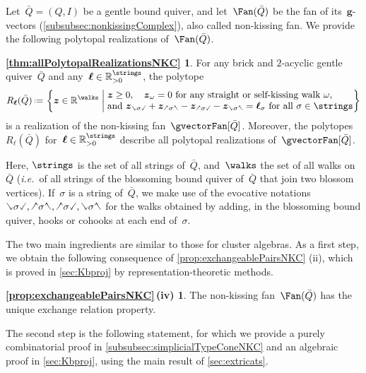 \documentclass{amsart}
\theoremstyle{definition}
\newcommand{\R}{\mathbb{R}} %
\renewcommand{\b}[1]{{\boldsymbol{#1}}} %
\newcommand{\set}[2]{\left\{ #1 \;\middle|\; #2 \right\}} %
\newcommand{\eqdef}{\mbox{\,\raisebox{0.2ex}{\scriptsize\ensuremath{\mathrm:}}\ensuremath{=}\,}} %
\newcommand{\ie}{\textit{i.e.}~} %
\newcommand{\quiver}{\bar Q} %
\newcommand{\hL}{\text{\rotatebox[origin=c]{180}{\checked}}}
\newcommand{\hR}{\text{\rotatebox[origin=c]{180}{\reflectbox{\checked}}}}
\newcommand{\cL}{\text{\reflectbox{\checked}}}
\newcommand{\cR}{\text{\checked}}
\newcommand{\hh}[1]{\hL#1\hR} %
\newcommand{\cc}[1]{\cL#1\cR} %
\newcommand{\hc}[1]{\hL#1\cR} %
\newcommand{\ch}[1]{\cL#1\hR} %
\begin{document}
Let~$\quiver = (Q,I)$ be a gentle bound quiver, and let~$\Fan(\quiver)$ be the fan of its~$\b{g}$-vectors (\cref{subsubsec:nonkissingComplex}), also called non-kissing fan.
We provide the following polytopal realizations of~$\Fan(\quiver)$.

\newtheorem*{thm:allPolytopalRealizationsNKC}{\cref{thm:allPolytopalRealizationsNKC}}
\begin{thm:allPolytopalRealizationsNKC}
For any brick and $2$-acyclic gentle quiver~$\quiver$ and any~$\b{\ell} \in \R_{>0}^{\strings}$, the polytope
\[
R_\b{\ell}(\quiver) \eqdef \set{\b{z} \in \R^{\walks}}{\begin{array}{@{}l@{}} \b{z} \ge 0, \quad \b{z}_\omega = 0 \text{ for any straight or self-kissing walk } \omega, \\ \text{and } \b{z}_{\cc{\sigma}} + \b{z}_{\hh{\sigma}} - \b{z}_{\hc{\sigma}} - \b{z}_{\ch{\sigma}} = \b{\ell}_\sigma \text{ for all } \sigma \in \strings\end{array}}
\]
is a realization of the non-kissing fan~$\gvectorFan[\quiver]$.
Moreover, the polytopes~$R_\b{\ell}(\quiver)$ for~$\b{\ell} \in \R_{>0}^{\strings}$ describe all polytopal realizations of~$\gvectorFan[\quiver]$.
\end{thm:allPolytopalRealizationsNKC}

Here, $\strings$ is the set of all strings of~$\quiver$, and~$\walks$ the set of all walks on~$\quiver$ (\ie of all strings of the blossoming bound quiver of~$\quiver$ that join two blossom vertices).
If~$\sigma$ is a string of~$\quiver$, we make use of the evocative notations~$\cc{\sigma}, \hh{\sigma}, \hc{\sigma}, \ch{\sigma}$ for the walks obtained by adding, in the blossoming bound quiver, hooks or cohooks at each end of~$\sigma$.

\medskip

The two main ingredients are similar to those for cluster algebras.
As a first step, we obtain the following consequence of \cref{prop:exchangeablePairsNKC} (ii), which is proved in \cref{sec:Kbproj} by representation-theoretic methods.

\newtheorem*{prop:exchangeablePairsNKC}{\cref{prop:exchangeablePairsNKC}\,{\normalfont (iv)}}
\begin{prop:exchangeablePairsNKC}
The non-kissing fan~$\Fan(\quiver)$ has the unique exchange relation property.
\end{prop:exchangeablePairsNKC}

The second step is the following statement, for which we provide a purely combinatorial proof in \cref{subsubsec:simplicialTypeConeNKC} and an algebraic proof in \cref{sec:Kbproj}, using the main result of \cref{sec:extricats}.
\end{document}
